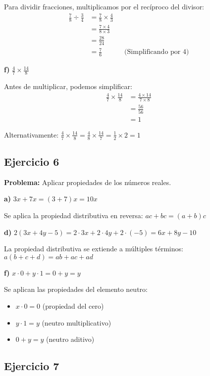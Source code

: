 Para dividir fracciones, multiplicamos por el recíproco del divisor:
\begin{align}
\frac{7}{8} \div \frac{3}{4} &= \frac{7}{8} \times \frac{4}{3}\\
&= \frac{7 \times 4}{8 \times 3}\\
&= \frac{28}{24}\\
&= \frac{7}{6} && \text{(Simplificando por 4)}
\end{align}

\textbf{f)} $\frac{4}{7} \times \frac{14}{8}$

Antes de multiplicar, podemos simplificar:
\begin{align}
\frac{4}{7} \times \frac{14}{8} &= \frac{4 \times 14}{7 \times 8}\\
&= \frac{56}{56}\\
&= 1
\end{align}

Alternativamente: $\frac{4}{7} \times \frac{14}{8} = \frac{4}{8} \times \frac{14}{7} = \frac{1}{2} \times 2 = 1$

\subsection*{Ejercicio 6}

\textbf{Problema:} Aplicar propiedades de los números reales.

\textbf{a)} $3x + 7x = (3 + 7)x = 10x$

Se aplica la propiedad distributiva en reversa: $ac + bc = (a + b)c$

\textbf{d)} $2(3x + 4y - 5) = 2 \cdot 3x + 2 \cdot 4y + 2 \cdot (-5) = 6x + 8y - 10$

La propiedad distributiva se extiende a múltiples términos: $a(b + c + d) = ab + ac + ad$

\textbf{f)} $x \cdot 0 + y \cdot 1 = 0 + y = y$

Se aplican las propiedades del elemento neutro:
\begin{itemize}
    \item $x \cdot 0 = 0$ (propiedad del cero)
    \item $y \cdot 1 = y$ (neutro multiplicativo)
    \item $0 + y = y$ (neutro aditivo)
\end{itemize}

\subsection*{Ejercicio 7}

